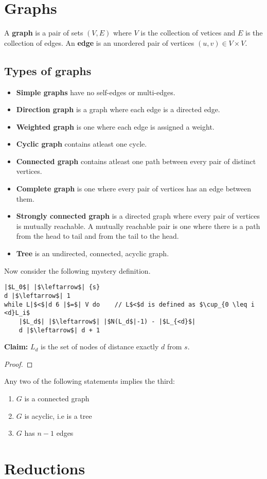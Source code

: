 \documentclass{tufte-handout}
\theoremstyle{definition}
\begin{document}
\section{Graphs}
A \textbf{graph} is a pair of sets $(V,E)$  where $V$ is the collection of vetices and $E$ is the collection of edges. An \textbf{edge} is an unordered pair of vertices $(u,v) \in V \times V$.

\subsection*{Types of graphs}
\begin{itemize}
    \item \textbf{Simple graphs} have no self-edges or multi-edges.
    \item \textbf{Direction graph} is a graph where each edge is a directed edge.
    \item \textbf{Weighted graph} is one where each edge is assigned a weight.
    \item \textbf{Cyclic graph} contains atleast one cycle.
    \item \textbf{Connected graph} contains atleast one path between every pair of distinct vertices.
    \item \textbf{Complete graph} is one where every pair of vertices has an edge between them.
    \item \textbf{Strongly connected graph} is a directed graph where every pair of vertices is mutually reachable. A mutually reachable pair is one where there is a path from the head to tail and from the tail to the head.
    \item \textbf{Tree} is an undirected, connected, acyclic graph.
\end{itemize}

Now consider the following mystery definition. 
\begin{verbatim}
|$L_0$| |$\leftarrow$| {s}
d |$\leftarrow$| 1
while L|$<$|d 6 |$=$| V do    // L$<$d is defined as $\cup_{0 \leq i <d}L_i$
    |$L_d$| |$\leftarrow$| |$N(L_d$|-1) - |$L_{<d}$|
    d |$\leftarrow$| d + 1
\end{verbatim}

\textbf{Claim:} $L_d$ is the set of nodes of distance exactly $d$ from $s$.
\begin{proof}
    
\end{proof}

\begin{theorem}
    Any two of the following statements implies the third:
    \begin{enumerate}
        \item $G$ is a connected graph
        \item $G$ is acyclic, i.e is a tree
        \item $G$ has $n-1$ edges
    \end{enumerate}
\end{theorem}


\section{Reductions}
\end{document}

